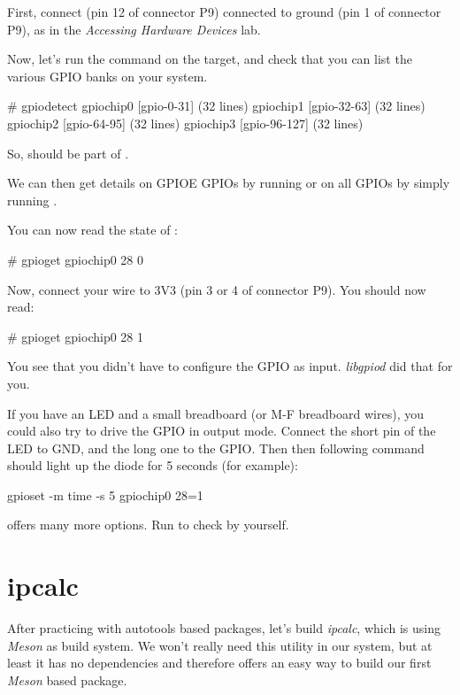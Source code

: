 First, connect  (pin 12 of connector P9) connected
to ground (pin 1 of connector P9), as in the
{\em Accessing Hardware Devices} lab.

Now, let's run the  command on the target, and check that
you can list the various GPIO banks on your system.

\begin{bashinput}
# gpiodetect
gpiochip0 [gpio-0-31] (32 lines)
gpiochip1 [gpio-32-63] (32 lines)
gpiochip2 [gpio-64-95] (32 lines)
gpiochip3 [gpio-96-127] (32 lines)
\end{bashinput}

So,  should be part of .

We can then get details on GPIOE GPIOs by running  or on all GPIOs by simply running .

You can now read the state of :

\begin{bashinput}
# gpioget gpiochip0 28
0
\end{bashinput}

Now, connect your wire to 3V3 (pin 3 or 4 of connector P9). You should now
read:

\begin{bashinput}
# gpioget gpiochip0 28
1
\end{bashinput}

You see that you didn't have to configure the GPIO as input. {\em
libgpiod} did that for you.

If you have an LED and a small breadboard (or M-F breadboard wires),
you could also try to drive the GPIO in output mode. Connect the short
pin of the LED to GND, and the long one to the GPIO. Then then following
command should light up the diode for 5 seconds (for example):

\begin{bashinput}
gpioset -m time -s 5  gpiochip0 28=1
\end{bashinput}

 offers many more options. Run  to
check by yourself.

\section{ipcalc}

After practicing with autotools based packages, let's build {\em ipcalc}, which
is using {\em Meson} as build system. We won't really need this utility
in our system, but at least it has no dependencies and therefore
offers an easy way to build our first {\em Meson} based package.

